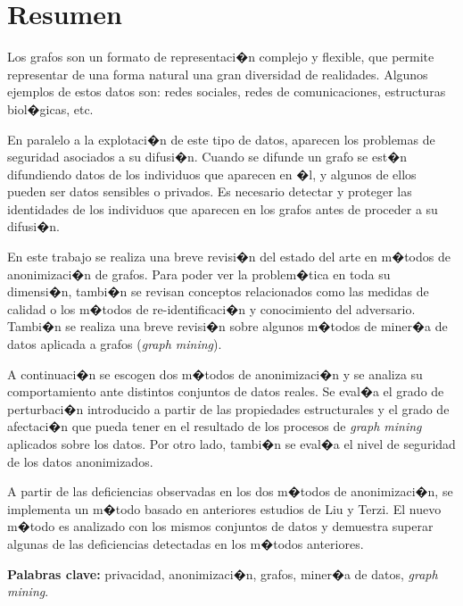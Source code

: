 \setcounter{page}{1} 
\pagestyle{plain}

\chapter*{Resumen}

\onehalfspacing

Los grafos son un formato de representaci�n complejo y flexible, que permite representar de una forma natural una gran diversidad de realidades. Algunos ejemplos de estos datos son: redes sociales, redes de comunicaciones, estructuras biol�gicas, etc.

En paralelo a la explotaci�n de este tipo de datos, aparecen los problemas de seguridad asociados a su difusi�n. Cuando se difunde un grafo se est�n difundiendo datos de los individuos que aparecen en �l, y algunos de ellos pueden ser datos sensibles o privados. Es necesario detectar y proteger las identidades de los individuos que aparecen en los grafos antes de proceder a su difusi�n.

En este trabajo se realiza una breve revisi�n del estado del arte en m�todos de anonimizaci�n de grafos. Para poder ver la problem�tica en toda su dimensi�n, tambi�n se revisan conceptos relacionados como las medidas de calidad o los m�todos de re-identificaci�n y conocimiento del adversario. Tambi�n se realiza una breve revisi�n sobre algunos m�todos de miner�a de datos aplicada a grafos (\emph{graph mining}).

A continuaci�n se escogen dos m�todos de anonimizaci�n y se analiza su comportamiento ante distintos conjuntos de datos reales. Se eval�a el grado de perturbaci�n introducido a partir de las propiedades estructurales y el grado de afectaci�n que pueda tener en el resultado de los procesos de \emph{graph mining} aplicados sobre los datos. Por otro lado, tambi�n se eval�a el nivel de seguridad de los datos anonimizados.

A partir de las deficiencias observadas en los dos m�todos de anonimizaci�n, se implementa un m�todo basado en anteriores estudios de Liu y Terzi. El nuevo m�todo es analizado con los mismos conjuntos de datos y demuestra superar algunas de las deficiencias detectadas en los m�todos anteriores.

\vspace*{1cm}

\textbf{Palabras clave:} privacidad, anonimizaci�n, grafos, miner�a de datos, \emph{graph mining}.
